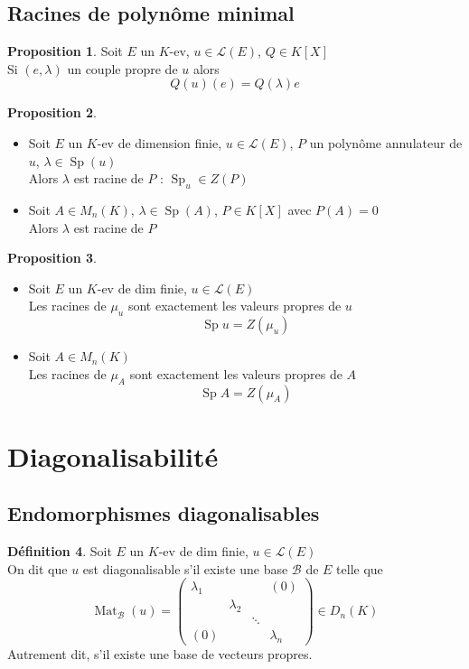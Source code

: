 \documentclass[10pt,a4paper]{article}
\theoremstyle{definition}
\newtheorem{proposition}{Proposition}[section]
\newtheorem{definition}[proposition]{Définition}
\DeclareMathOperator{\Sp}{Sp}
\DeclareMathOperator*{\Mat}{Mat}
\begin{document}
\subsection{Racines de polynôme minimal}
\begin{proposition}
Soit $E$ un $K$-ev, $u \in \mathcal{L}(E)$, $Q \in K[X]$ \\
Si $(e, \lambda)$ un couple propre de $u$ alors 
\[ \boxed{Q(u)(e) = Q(\lambda)e} \]
\end{proposition}
\begin{proposition}
\hfill \begin{itemize}
\item Soit $E$ un $K$-ev de dimension finie, $u \in \mathcal{L}(E)$, $P$ un polynôme annulateur de $u$, $\lambda \in \Sp(u)$ \\
Alors $\lambda$ est racine de $P$ : $\Sp_u \in Z(P)$
\item Soit $A \in M_n(K)$, $\lambda \in \Sp(A)$, $P \in K[X]$ avec $P(A) = 0$ \\
Alors $\lambda$ est racine de $P$
\end{itemize}
\end{proposition}
\begin{proposition}
\hfill \begin{itemize}
\item Soit $E$ un $K$-ev de dim finie, $u \in \mathcal{L}(E)$ \\
Les racines de $\mu_u$ sont exactement les valeurs propres de $u$
\[ \boxed{\Sp u = Z(\mu_u)} \]
\item Soit $A \in M_n(K)$ \\
Les racines de $\mu_A$ sont exactement les valeurs propres de $A$
\[ \boxed{\Sp A = Z(\mu_A)} \]
\end{itemize}
\end{proposition}

\section{Diagonalisabilité}
\subsection{Endomorphismes diagonalisables}
\begin{definition}
Soit $E$ un $K$-ev de dim finie, $u \in \mathcal{L}(E)$ \\
On dit que $u$ est diagonalisable s'il existe une base $\mathcal{B}$ de $E$ telle que 
\[ \Mat_\mathcal{B}(u) = \begin{pmatrix}
\lambda_1 & & & (0) \\
& \lambda_2 & & \\
& & \ddots & \\
(0) & & & \lambda_n
\end{pmatrix} \in D_n(K) \]
Autrement dit, s'il existe une base de vecteurs propres.
\end{definition}
\end{document}
